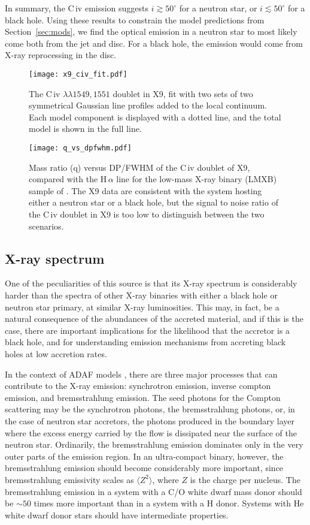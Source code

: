 \documentclass[a4paper,fleqn,usenatbib]{mnras}
\begin{document}
In summary, the C\,{\sc iv} emission suggests $i \gtrsim 50^\circ$ for a neutron star, or $i \lesssim 50^\circ$ for a black hole. Using these results to constrain the model predictions from Section~\ref{sec:mods}, we find the optical emission in a neutron star to most likely come both from the jet and disc. For a black hole, the emission would come from X-ray reprocessing in the disc.

\begin{figure}
	\texttt{[image: x9\_civ\_fit.pdf]}
	\caption{The C\,{\sc iv} $\lambda\lambda 1549,1551$ doublet in X9, fit with two sets of two symmetrical Gaussian line profiles added to the local continuum. Each model component is displayed with a dotted line, and the total model is shown in the full line.}
	\label{fig:civ_fit}
\end{figure}
%
\begin{figure}
	\texttt{[image: q\_vs\_dpfwhm.pdf]}
	\caption{Mass ratio (q) versus DP/FWHM of the C\,{\sc iv} doublet of X9, compared with the H\,$\alpha$ line for the low-mass X-ray binary (LMXB) sample of \citet{2016ApJ...822...99C}. The X9 data are consistent with the system hosting either a neutron star or a black hole, but the signal to noise ratio of the C\,{\sc iv} doublet in X9 is too low to distinguish between the two scenarios.}
	\label{fig:q_vs_dpfwhm}
\end{figure}

\subsection{X-ray spectrum}
\label{sec:x-spec}

One of the peculiarities of this source is that its X-ray spectrum is considerably harder than the spectra of other X-ray binaries with either a black hole or neutron star primary, at similar X-ray luminosities. This may, in fact, be a natural consequence of the abundances of the accreted material, and if this is the case, there are important implications for the likelihood that the accretor is a black hole, and for understanding emission mechanisms from accreting black holes at low accretion rates.

In the context of ADAF models \citep{1995ApJ...452..710N}, there are three major processes that can contribute to the X-ray emission: synchrotron emission, inverse compton emission, and bremsstrahlung emission. The seed photons for the Compton scattering may be the synchrotron photons, the bremsstrahlung photons, or, in the case of neutron star accretors, the photons produced in the boundary layer where the excess energy carried by the flow is dissipated near the surface of the neutron star. Ordinarily, the bremsstrahlung emission dominates only in the very outer parts of the emission region. In an ultra-compact binary, however, the bremsstrahlung emission should become considerably more important, since bremsstrahlung emissivity scales as $\langle Z^2 \rangle$, where $Z$ is the charge per nucleus. The bremsstrahlung emission in a system with a C/O white dwarf mass donor should be $\sim50$ times more important than in a system with a H donor. Systems with He white dwarf donor stars should have intermediate properties. 
\end{document}
